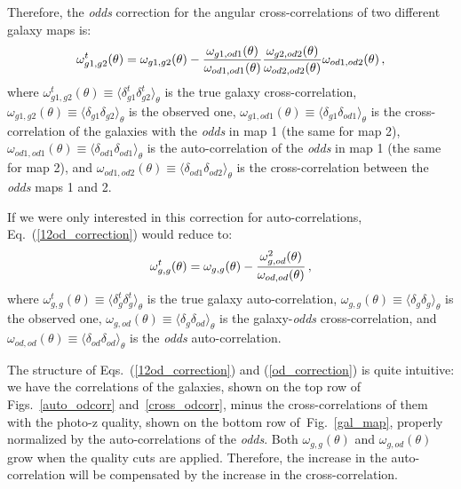 Therefore, the \textit{odds} correction for the angular cross-correlations of two different galaxy maps is:
\begin{equation}
\omega^t_{g1,g2}(\theta) = \omega_{g1,g2}(\theta) - {\omega_{g1,od1}(\theta) \over \omega_{od1,od1}(\theta)}{\omega_{g2,od2}(\theta)\over\omega_{od2,od2}(\theta)}\omega_{od1,od2}(\theta) \, ,
\label{12od_correction}
\end{equation}
where $\omega^t_{g1,g2}(\theta)\equiv \langle \delta^t_{g1} \delta^t_{g2} \rangle_\theta$ is the true galaxy cross-correlation, $\omega_{g1,g2}(\theta) \equiv \langle \delta_{g1} \delta_{g2} \rangle_\theta$ is the observed one, $\omega_{g1,od1}(\theta) \equiv \langle \delta_{g1} \delta_{od1} \rangle_\theta$ is the cross-correlation of the galaxies with the \textit{odds} in map 1 (the same for map 2), $\omega_{od1,od1}(\theta) \equiv \langle \delta_{od1} \delta_{od1} \rangle_\theta$ is the auto-correlation of the \textit{odds} in  map 1 (the same for map 2), and $\omega_{od1,od2}(\theta) \equiv \langle \delta_{od1} \delta_{od2} \rangle_\theta$ is the cross-correlation between the \textit{odds} maps 1 and 2.

If we were only interested in this correction for auto-correlations,
Eq.~(\ref{12od_correction}) would reduce to:
\begin{equation}
\omega^t_{g,g}(\theta) = \omega_{g,g}(\theta) - {\omega_{g,od}^2(\theta)\over\omega_{od,od}(\theta)} \, ,
\label{od_correction}
\end{equation}
where $\omega^t_{g,g}(\theta) \equiv \langle \delta^t_{g} \delta^t_{g} \rangle_\theta$ is the true galaxy auto-correlation, $\omega_{g,g}(\theta) \equiv \langle \delta_g \delta_g \rangle_\theta$ is the observed one, $\omega_{g,od}(\theta) \equiv \langle \delta_g \delta_{od} \rangle_\theta$ is the galaxy-\textit{odds} cross-correlation, and $\omega_{od,od}(\theta) \equiv \langle \delta_{od} \delta_{od} \rangle_\theta$ is the \textit{odds} auto-correlation.

The structure of Eqs.~(\ref{12od_correction}) and (\ref{od_correction}) is quite intuitive: we have the
correlations of the galaxies, shown on the top row of Figs.~\ref{auto_odcorr} and~\ref{cross_odcorr}, minus the cross-correlations of them with the photo-z quality, shown on the bottom row of~Fig.~\ref{gal_map}, properly normalized by the auto-correlations of the \textit{odds}.
Both $\omega_{g,g}(\theta)$ and $\omega_{g,od}(\theta)$ grow when the quality cuts are applied. Therefore, the increase in the auto-correlation will be compensated by the increase in the cross-correlation.

